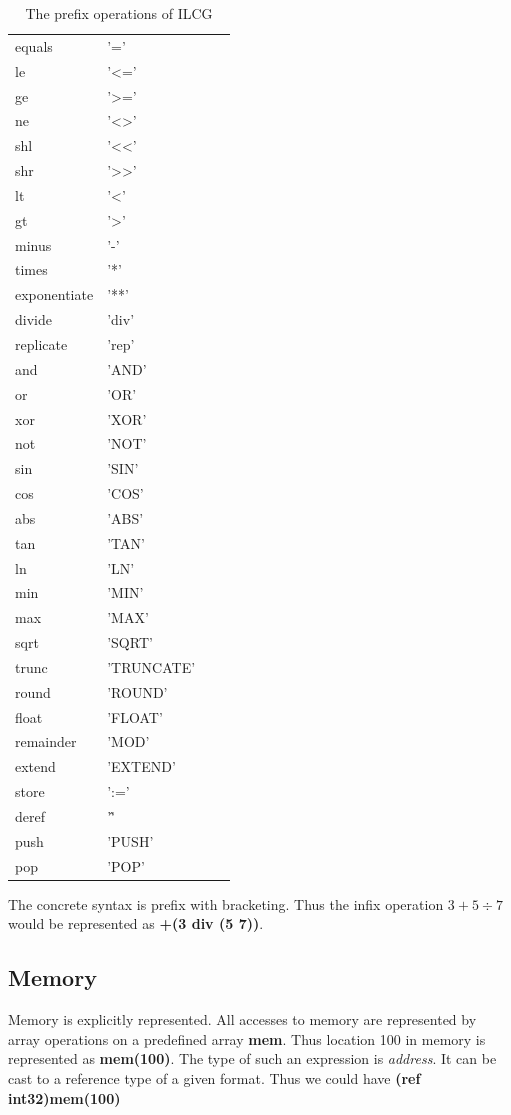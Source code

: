 {{\begin{table}[t]
\begin{tabular}{llll}
 equals & '='&&\\
 le & '<='&&\\
 ge&'>='&&\\
 ne&'<>'&&\\
 shl&'<<'&&\\
 shr&'>>'&&\\
 lt&'<'&&\\
 gt&'>'&&\\
 minus & '-'&&\\
 times & '*'&&\\
 exponentiate & '**'&&\\
 divide & 'div'&&\\
 replicate & 'rep'&&\\
 and & 'AND'&&\\
 or & 'OR' &&\\
 xor & 'XOR'&&\\
 not & 'NOT'&&\\
 sin&'SIN'&&\\
 cos&'COS'&&\\
 abs&'ABS'&&\\
 tan&'TAN'&&\\
 ln&'LN'&&\\
 min&'MIN'&&\\
 max&'MAX'&&\\
 sqrt&'SQRT'&&\\
 trunc&'TRUNCATE'&&\\
 round&'ROUND'&&\\
 float&'FLOAT'&&\\
 remainder & 'MOD'&&\\
 extend& 'EXTEND'&&\\
 store & ':='&&\\
 deref & '\^'&&\\
 push &'PUSH'&&\\
 pop &'POP'&&\\
 
\end{tabular}
\caption{The prefix operations of ILCG}
\label{tab:}
\end{table}

The concrete syntax is prefix with bracketing. Thus the infix operation
$3+5\div 7$ would be represented as \textbf{+(3 div (5 7))}. 


\subsection{Memory}

Memory is explicitly represented. All accesses to memory are represented
by array operations on a predefined array \textbf{mem}. Thus location
100 in memory is represented as \textbf{mem(100)}. The type of such
an expression is \textsl{address}. It can be cast to a reference type
of a given format. Thus we could have \textbf{(ref int32)mem(100) }


}}
